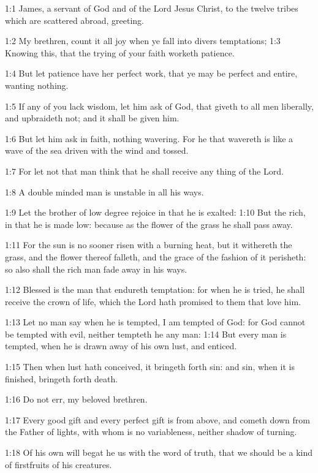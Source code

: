 

1:1 James, a servant of God and of the Lord Jesus Christ,
to the twelve tribes which are scattered abroad, greeting.

1:2 My brethren, count it all joy when ye fall into divers
temptations; 1:3 Knowing this, that the trying of your faith worketh
patience.

1:4 But let patience have her perfect work, that ye may be perfect and
entire, wanting nothing.

1:5 If any of you lack wisdom, let him ask of God, that giveth to all
men liberally, and upbraideth not; and it shall be given him.

1:6 But let him ask in faith, nothing wavering. For he that wavereth
is like a wave of the sea driven with the wind and tossed.

1:7 For let not that man think that he shall receive any thing of the
Lord.

1:8 A double minded man is unstable in all his ways.

1:9 Let the brother of low degree rejoice in that he is exalted: 1:10
But the rich, in that he is made low: because as the flower of the
grass he shall pass away.

1:11 For the sun is no sooner risen with a burning heat, but it
withereth the grass, and the flower thereof falleth, and the grace of
the fashion of it perisheth: so also shall the rich man fade away in
his ways.

1:12 Blessed is the man that endureth temptation: for when he is
tried, he shall receive the crown of life, which the Lord hath
promised to them that love him.

1:13 Let no man say when he is tempted, I am tempted of God: for God
cannot be tempted with evil, neither tempteth he any man: 1:14 But
every man is tempted, when he is drawn away of his own lust, and
enticed.

1:15 Then when lust hath conceived, it bringeth forth sin: and sin,
when it is finished, bringeth forth death.

1:16 Do not err, my beloved brethren.

1:17 Every good gift and every perfect gift is from above, and cometh
down from the Father of lights, with whom is no variableness, neither
shadow of turning.

1:18 Of his own will begat he us with the word of truth, that we
should be a kind of firstfruits of his creatures.

